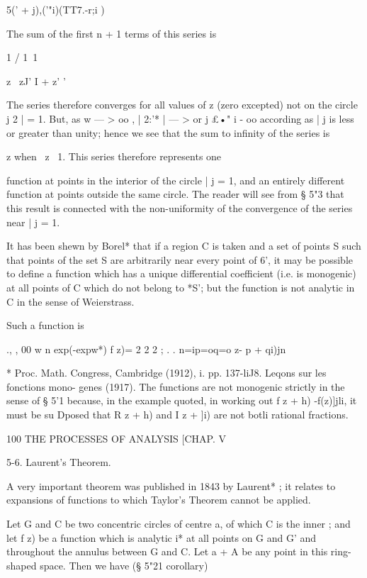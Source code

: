 {{5(' + j)\!,('"i)(TT7.-r;i )



The sum of the first n + 1 terms of this series is

1 / 1\ 1



z \ zJ' I + z' '

The series therefore converges for all values of z (zero excepted) not
on the circle j 2 | = 1. But, as w — > oo , | 2:'* | — > or j £•" i -
oo according as | j is less or greater than unity; hence we see that
the sum to infinity of the series is

z when \ z\ < 1, and - when | j > 1. This series therefore represents
one

function at points in the interior of the circle | j = 1, and an
entirely different function at points outside the same circle. The
reader will see from § 5"3 that this result is connected with the
non-uniformity of the convergence of the series near | j = 1.

It has been shewn by Borel* that if a region C is taken and a set of
points S such that points of the set S are arbitrarily near every
point of 6', it may be possible to define a function which has a
unique differential coefficient (i.e. is monogenic) at all points of C
which do not belong to *S'; but the function is not analytic in C in
the sense of Weierstrass.



Such a function is



., , 00 w n exp(-expw*) f z)= 2 2 2 ; . . n=ip=oq=o z- p + qi)jn



* Proc. Math. Congress, Cambridge (1912), i. pp. 137-liJ8. Leqons sur
les fonctions mono- genes (1917). The functions are not monogenic
strictly in the sense of § 5'1 because, in the example quoted, in
working out f z + h) -f(z)]jli, it must be su Dposed that R z + h) and
I z + ]i) are not botli rational fractions.



100 THE PROCESSES OF ANALYSIS [CHAP. V

5-6. Laurent's Theorem.

A very important theorem was published in 1843 by Laurent* ; it
relates to expansions of functions to which Taylor's Theorem cannot be
applied.

Let G and C be two concentric circles of centre a, of which C is the
inner ; and let f z) be a function which is analytic i* at all points
on G and G' and throughout the annulus between G and C. Let a + A be
any point in this ring-shaped space. Then we have (§ 5"21 corollary)

}}
